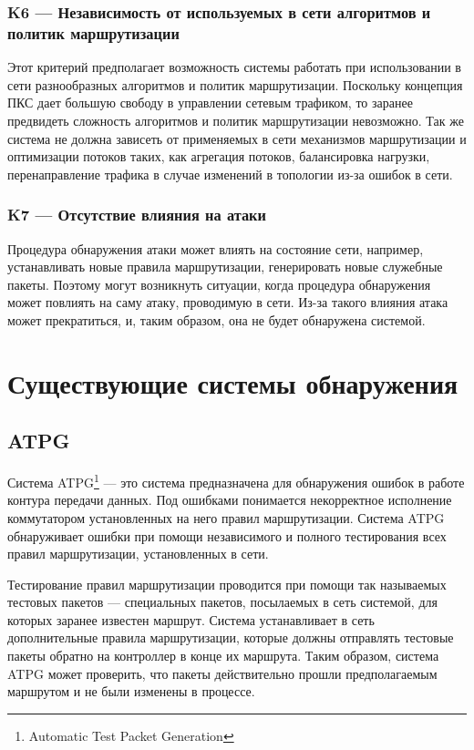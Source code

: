 \documentclass[../thesis.tex]{subfiles}
\begin{document}
\subsubsection{K6 --- Независимость от используемых в сети алгоритмов и политик маршрутизации} \label{criterion:K6}

Этот критерий предполагает возможность системы работать при использовании в сети разнообразных алгоритмов и политик маршрутизации.
Поскольку концепция ПКС дает большую свободу в управлении сетевым трафиком, то заранее предвидеть сложность алгоритмов и политик маршрутизации невозможно.
Так же система не должна зависеть от применяемых в сети механизмов маршрутизации и оптимизации потоков таких, как агрегация потоков, балансировка нагрузки, перенаправление трафика в случае изменений в топологии из-за ошибок в сети.

\subsubsection{K7 --- Отсутствие влияния на атаки} \label{criterion:K7}

Процедура обнаружения атаки может влиять на состояние сети, например, устанавливать новые правила маршрутизации, генерировать новые служебные пакеты.
Поэтому могут возникнуть ситуации, когда процедура обнаружения может повлиять на саму атаку, проводимую в сети.
Из-за такого влияния атака может прекратиться, и, таким образом, она не будет обнаружена системой.

\section{Существующие системы обнаружения}

\subsection{ATPG} \label{subsection:atpg}

Система ATPG\footnote{Automatic Test Packet Generation} \cite{zeng2012automatic} --- это система предназначена для обнаружения ошибок в работе контура передачи данных. Под ошибками понимается некорректное исполнение коммутатором установленных на него правил маршрутизации.
Система ATPG обнаруживает ошибки при помощи независимого и полного тестирования всех правил маршрутизации, установленных в сети.

Тестирование правил маршрутизации проводится при помощи так называемых тестовых пакетов --- специальных пакетов, посылаемых в сеть системой, для которых заранее известен маршрут.
Система устанавливает в сеть дополнительные правила маршрутизации, которые должны отправлять тестовые пакеты обратно на контроллер в конце их маршрута.
Таким образом, система ATPG может проверить, что пакеты действительно прошли предполагаемым маршрутом и не были изменены в процессе.
\end{document}
